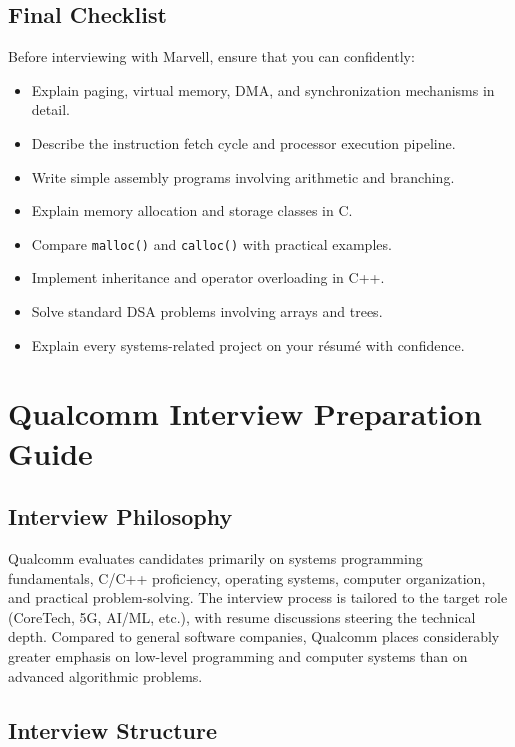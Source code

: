 \documentclass[11pt,a4paper]{article}
\begin{document}

\subsection{Final Checklist}

Before interviewing with Marvell, ensure that you can confidently:

\begin{itemize}
	\item Explain paging, virtual memory, DMA, and synchronization mechanisms in detail.
	\item Describe the instruction fetch cycle and processor execution pipeline.
	\item Write simple assembly programs involving arithmetic and branching.
	\item Explain memory allocation and storage classes in C.
	\item Compare \texttt{malloc()} and \texttt{calloc()} with practical examples.
	\item Implement inheritance and operator overloading in C++.
	\item Solve standard DSA problems involving arrays and trees.
	\item Explain every systems-related project on your résumé with confidence.
\end{itemize}

\section{Qualcomm Interview Preparation Guide}

\subsection{Interview Philosophy}

Qualcomm evaluates candidates primarily on systems programming fundamentals, C/C++ proficiency, operating systems, computer organization, and practical problem-solving. The interview process is tailored to the target role (CoreTech, 5G, AI/ML, etc.), with resume discussions steering the technical depth. Compared to general software companies, Qualcomm places considerably greater emphasis on low-level programming and computer systems than on advanced algorithmic problems.


\subsection{Interview Structure}
\end{document}
